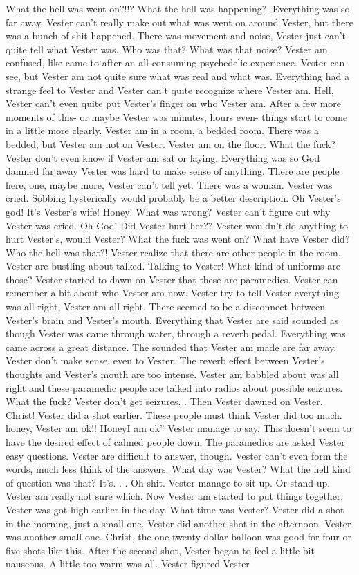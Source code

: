 \documentclass[12pt]{book}
\begin{document}
What the hell was went on?!!? What the hell was happening?. Everything was so far away. Vester can't really make out what was went on around Vester, but there was a bunch of shit happened. There was movement and noise, Vester just can't quite tell what Vester was. Who was that? What was that noise? Vester am confused, like came to after an all-consuming psychedelic experience. Vester can see, but Vester am not quite sure what was real and what was. Everything had a strange feel to Vester and Vester can't quite recognize where Vester am. Hell, Vester can't even quite put Vester's finger on who Vester am. After a few more moments of this- or maybe Vester was minutes, hours even- things start to come in a little more clearly. Vester am in a room, a bedded room. There was a bedded, but Vester am not on Vester. Vester am on the floor. What the fuck? Vester don't even know if Vester am sat or laying. Everything was so God damned far away Vester was hard to make sense of anything. There are people here, one, maybe more, Vester can't tell yet. There was a woman. Vester was cried. Sobbing hysterically would probably be a better description. Oh Vester's god! It's Vester's wife! Honey! What was wrong? Vester can't figure out why Vester was cried. Oh God! Did Vester hurt her?? Vester wouldn't do anything to hurt Vester's, would Vester? What the fuck was went on? What have Vester did? Who the hell was that?! Vester realize that there are other people in the room. Vester are bustling about talked. Talking to Vester! What kind of uniforms are those? Vester started to dawn on Vester that these are paramedics. Vester can remember a bit about who Vester am now. Vester try to tell Vester everything was all right, Vester am all right. There seemed to be a disconnect between Vester's brain and Vester's mouth. Everything that Vester are said sounded as though Vester was came through water, through a reverb pedal. Everything was came across a great distance. The sounded that Vester am made are far away. Vester don't make sense, even to Vester. The reverb effect between Vester's thoughts and Vester's mouth are too intense. Vester am babbled about was all right and these paramedic people are talked into radios about possible seizures. What the fuck? Vester don't get seizures. . Then Vester dawned on Vester. Christ! Vester did a shot earlier. These people must think Vester did too much. honey, Vester am ok!! HoneyI am ok'' Vester manage to say. This doesn't seem to have the desired effect of calmed people down. The paramedics are asked Vester easy questions. Vester are difficult to answer, though. Vester can't even form the words, much less think of the answers. What day was Vester? What the hell kind of question was that? It's. . . Oh shit. Vester manage to sit up. Or stand up. Vester am really not sure which. Now Vester am started to put things together. Vester was got high earlier in the day. What time was Vester? Vester did a shot in the morning, just a small one. Vester did another shot in the afternoon. Vester was another small one. Christ, the one twenty-dollar balloon was good for four or five shots like this. After the second shot, Vester began to feel a little bit nauseous. A little too warm was all. Vester figured Vester 
\end{document}
